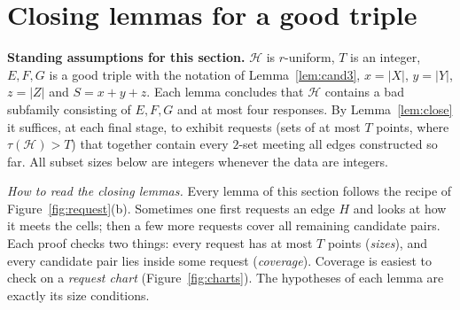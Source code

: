 \documentclass[11pt]{amsart}
\theoremstyle{definition}
\theoremstyle{remark}
\newcommand{\cH}{\mathcal H}
\begin{document}
\section{Closing lemmas for a good triple}\label{sec:closing}

\noindent\textbf{Standing assumptions for this section.} $\cH$ is $r$-uniform, $T$ is an integer, $E,F,G$ is a good triple with the notation of Lemma~\ref{lem:cand3}, $x=|X|$, $y=|Y|$, $z=|Z|$ and $S=x+y+z$. Each lemma concludes that $\cH$ contains a bad subfamily consisting of $E,F,G$ and at most four responses. By Lemma~\ref{lem:close} it suffices, at each final stage, to exhibit requests (sets of at most $T$ points, where $\tau(\cH)>T$) that together contain every $2$-set meeting all edges constructed so far. All subset sizes below are integers whenever the data are integers.

\smallskip\noindent\emph{How to read the closing lemmas.} Every lemma of this section follows the recipe of Figure~\ref{fig:request}(b). Sometimes one first requests an edge $H$ and looks at how it meets the cells; then a few more requests cover all remaining candidate pairs. Each proof checks two things: every request has at most $T$ points (\emph{sizes}), and every candidate pair lies inside some request (\emph{coverage}). Coverage is easiest to check on a \emph{request chart} (Figure~\ref{fig:charts}). The hypotheses of each lemma are exactly its size conditions.
\end{document}
